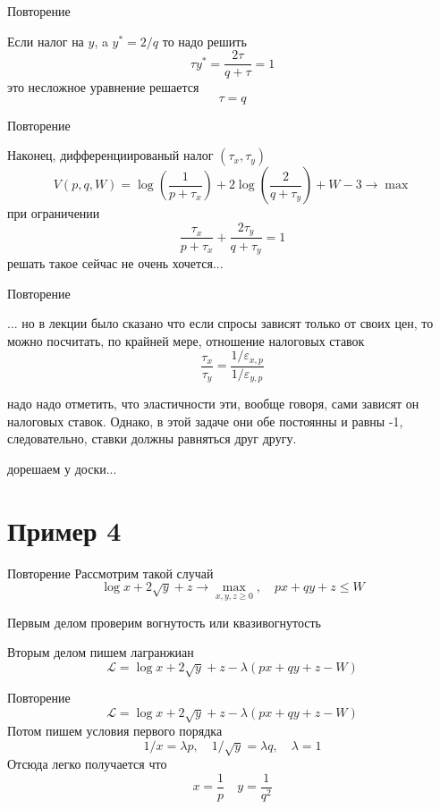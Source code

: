 \documentclass{beamer}
\begin{document}
\begin{frame}{Повторение}

Если налог на $y$, a $y^* = 2/q$ то надо решить
$$ \tau y^* = \frac{2\tau}{q+\tau} = 1$$
это несложное уравнение решается
$$ \tau = q$$

\end{frame}

\begin{frame}{Повторение}

Наконец, дифференциированый налог $(\tau_x, \tau_y)$
$$ V(p,q,W) = \log(\frac{1}{p+\tau_x}) + 2 \log(\frac{2}{q+\tau_y}) + W - 3 \to  \max$$
при ограничении $$ \frac{\tau_x}{p+\tau_x} + \frac{2\tau_y}{q+\tau_y} = 1$$
решать такое сейчас не очень хочется...

\end{frame}

\begin{frame}{Повторение}

... но в лекции было сказано что если спросы зависят только от своих цен, то можно посчитать, по крайней мере, отношение налоговых ставок
$$\frac{\tau_x}{\tau_y} = \frac{1/\varepsilon_{x,p}}{1/\varepsilon_{y,p}}$$

надо надо отметить, что эластичности эти, вообще говоря, сами зависят он налоговых ставок. Однако, в этой задаче они обе постоянны и равны -1, следовательно, ставки должны равняться друг другу.

дорешаем у доски...

\end{frame}

\section{Пример 4}

\begin{frame}{Повторение}
Рассмотрим такой случай
$$ \log x + 2 \sqrt{y} + z \to \max_{x,y,z \geqslant 0}, \quad px + qy + z \leqslant W$$

Первым делом проверим вогнутость или квазивогнутость

Вторым делом пишем лагранжиан
$$\mathcal{L} = \log x + 2 \sqrt{y} + z - \lambda (px + qy + z - W)$$
\end{frame}

\begin{frame}{Повторение}
$$\mathcal{L} = \log x + 2 \sqrt{y} + z - \lambda (px + qy + z - W)$$
Потом пишем условия первого порядка
$$ 1/x = \lambda p, \quad 1/\sqrt{y} = \lambda q, \quad \lambda = 1$$
Отсюда легко получается что
$$ x = \frac{1}{p} \quad y = \frac{1}{q^2}$$
\end{frame}
\end{document}
